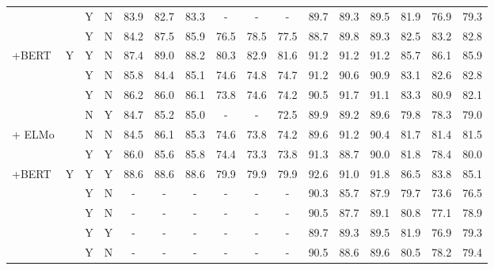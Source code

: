 \begin{table*}[t]
\begin{center}
\begin{tabular}{lccccccccccccccc}

\citet{DBLP:conf/acl/ZhaoHLB18} & & Y & N & 83.9 & 82.7 & 83.3 & - & - & - & 89.7 & 89.3 & 89.5 & 81.9 & 76.9 & 79.3\\
\rowcolor{gray!15}
\citet{DBLP:conf/emnlp/ZhouLZ20} & & Y & N & 84.2 & 87.5 & 85.9 & 76.5 & 78.5 & 77.5 & 88.7 & 89.8 & 89.3 & 82.5 & 83.2 & 82.8 \\
\rowcolor{gray!15}
\quad+BERT & Y & Y & N & 87.4 & 89.0 & 88.2 & 80.3 & 82.9 & 81.6 & 91.2 & 91.2 & 91.2 & 85.7 & 86.1 & 85.9 \\
\citet{DBLP:journals/taslp/MunirZL21} & & Y & N & 85.8 & 84.4 & 85.1 & 74.6 & 74.8 & 74.7 & 91.2 & 90.6 & 90.9 & 83.1 & 82.6 & 82.8\\
\rowcolor{gray!15}
\citet{DBLP:journals/coling/LiZHC21} & & Y & N & 86.2 & 86.0 & 86.1 & 73.8 & 74.6 & 74.2 & 90.5 & 91.7 & 91.1 & 83.3 & 80.9 & 82.1\\
\citet{DBLP:conf/coling/CaiHLZ18} & & N & Y & 84.7 & 85.2 & 85.0 & - & - & 72.5 & 89.9 & 89.2 & 89.6 & 79.8 & 78.3 & 79.0\\
\rowcolor{gray!15}
\citet{DBLP:conf/aaai/LiHZZZZZ19} + ELMo & & N & N & 84.5 & 86.1 & 85.3 & 74.6 & 73.8 & 74.2 & 89.6 & 91.2 & 90.4 & 81.7 & 81.4 & 81.5\\
\citet{DBLP:conf/emnlp/LiZWP20} & & Y & Y & 86.0 & 85.6 & 85.8 & 74.4 & 73.3 & 73.8 & 91.3 & 88.7 & 90.0 & 81.8 & 78.4 & 80.0\\
\quad+BERT & Y & Y & Y & 88.6 & 88.6 & 88.6 & 79.9 & 79.9 & 79.9 & 92.6 & 91.0 & 91.8 & 86.5 & 83.8 & 85.1\\
\rowcolor{gray!15}
\citet{DBLP:conf/aaai/XiaL0ZFWS19} & & Y & N & - & - & - & - & - & - & 90.3 & 85.7 & 87.9 & 79.7 & 73.6 & 76.5 \\
\citet{DBLP:conf/emnlp/MarcheggianiT17} & & Y & N & - & - & - & - & - & - & 90.5 & 87.7 & 89.1 & 80.8 & 77.1 & 78.9\\
\rowcolor{gray!15}
\citet{DBLP:conf/acl/ZhaoHLB18} & & Y & Y & - & - & - & - & - & - & 89.7 & 89.3 & 89.5 & 81.9 & 76.9 & 79.3\\ 
\citet{DBLP:journals/tacl/CaiL19} & & Y & N & - & - & - & - & - & - & 90.5 & 88.6 & 89.6 & 80.5 & 78.2 & 79.4\\

\end{tabular}
\end{center}
\end{table*}
